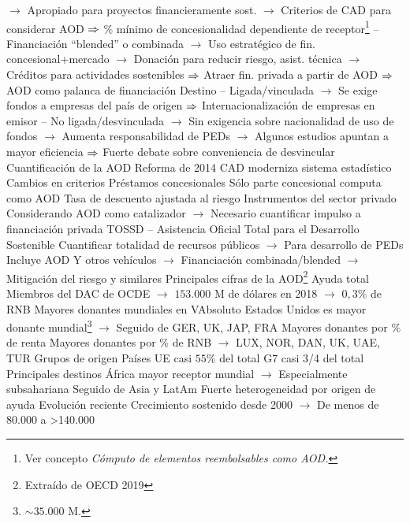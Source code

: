 \documentclass{nuevotema}
\begin{document}
\begin{esquemal}
				\4[] $\to$ Apropiado para proyectos financieramente sost.
				\4[] $\to$ Criterios de CAD para considerar AOD
				\4[] $\Rightarrow$ \% mínimo de concesionalidad dependiente de receptor\footnote{Ver concepto \textit{Cómputo de elementos reembolsables como AOD.}}
				\4[] -- Financiación ``blended'' o combinada
				\4[] $\to$ Uso estratégico de fin. concesional+mercado
				\4[] $\to$ Donación para reducir riesgo, asist. técnica
				\4[] $\to$ Créditos para actividades sostenibles
				\4[] $\Rightarrow$ Atraer fin. privada a partir de AOD
				\4[] $\Rightarrow$ AOD como palanca de financiación
				\4 Destino
				\4[] -- Ligada/vinculada
				\4[] $\to$ Se exige fondos a empresas del país de origen
				\4[] $\Rightarrow$ Internacionalización de empresas en emisor
				\4[] -- No ligada/desvinculada
				\4[] $\to$ Sin exigencia sobre nacionalidad de uso de fondos
				\4[] $\to$ Aumenta responsabilidad de PEDs
				\4[] $\to$ Algunos estudios apuntan a mayor eficiencia
				\4[] $\Rightarrow$ Fuerte debate sobre conveniencia de desvincular
			\3 Cuantificación de la AOD
				\4 Reforma de 2014
				\4[] CAD moderniza sistema estadístico
				\4[] Cambios en criterios
				\4 Préstamos concesionales
				\4[] Sólo parte concesional computa como AOD
				\4[] Tasa de descuento ajustada al riesgo
				\4 Instrumentos del sector privado
				\4[] Considerando AOD como catalizador
				\4[] $\to$ Necesario cuantificar impulso a financiación privada
				\4 TOSSD -- Asistencia Oficial Total para el Desarrollo Sostenible
				\4[] Cuantificar totalidad de recursos públicos
				\4[] $\to$ Para desarrollo de PEDs
				\4[] Incluye AOD Y otros vehículos
				\4[] $\to$ Financiación combinada/blended
				\4[] $\to$ Mitigación del riesgo y similares
			\3 Principales cifras de la AOD\footnote{Extraído de OECD 2019}
				\4 Ayuda total
				\4[] Miembros del DAC de OCDE
				\4[] $\to$ $153.000$ M de dólares en 2018
				\4[] $\to$ $0,3\%$ de RNB
				\4 Mayores donantes mundiales en VAbsoluto
				\4[] Estados Unidos es mayor donante mundial\footnote{$\sim 35.000$ M.}
				\4[] $\to$ Seguido de GER, UK, JAP, FRA
				\4 Mayores donantes por $\%$ de renta
				\4[] Mayores donantes por $\%$ de RNB
				\4[] $\to$ LUX, NOR, DAN, UK, UAE, TUR
				\4 Grupos de origen
				\4[] Países UE casi $55\%$ del total
				\4[] G7 casi 3/4 del total
				\4 Principales destinos
				\4[] África mayor receptor mundial
				\4[] $\to$ Especialmente subsahariana
				\4[] Seguido de Asia y LatAm
				\4[] Fuerte heterogeneidad por origen de ayuda
				\4 Evolución reciente
				\4[] Crecimiento sostenido desde 2000
				\4[] $\to$ De menos de 80.000 a >140.000

\end{esquemal}
\end{document}

